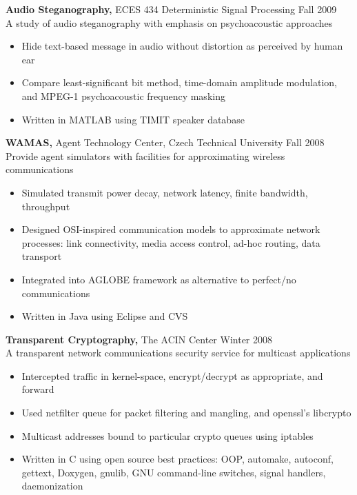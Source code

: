 \documentclass[margin]{res}
\begin{document}
\begin{resume}
\begin{telecom}
 {\bf Audio Steganography,} ECES 434 Deterministic Signal Processing \hfill Fall 2009 \\
A study of audio steganography with emphasis on psychoacoustic approaches
 \begin{itemize} \itemsep -2pt  %
 \item Hide text-based message in audio without distortion as perceived by human ear
 \item Compare least-significant bit method, time-domain amplitude modulation, and MPEG-1 psychoacoustic frequency masking 
 \item Written in MATLAB using TIMIT speaker database
 \end{itemize}
\end{telecom}

\begin{tech}
{\bf WAMAS,} Agent Technology Center, Czech Technical University \hfill Fall 2008 \\
Provide agent simulators with facilities for approximating wireless communications
\begin{itemize} \itemsep -2pt %
\item Simulated transmit power decay, network latency, finite bandwidth, throughput
\item Designed OSI-inspired communication models to approximate network processes: link connectivity, media access control, ad-hoc routing, data transport
\item Integrated into AGLOBE framework as alternative to perfect/no communications
\item Written in Java using Eclipse and CVS
\end{itemize}
\end{tech}

\begin{tech}
{\bf Transparent Cryptography,} The ACIN Center \hfill Winter 2008 \\
A transparent network communications security service for multicast applications
\begin{itemize} \itemsep -2pt %
\item Intercepted traffic in kernel-space, encrypt/decrypt as appropriate, and forward
\item Used netfilter queue for packet filtering and mangling, and openssl's libcrypto
\item Multicast addresses bound to particular crypto queues using iptables
\item Written in C using open source best practices: OOP, automake, autoconf, gettext, Doxygen, gnulib, GNU command-line switches, signal handlers, daemonization
\end{itemize}
\end{tech}


\end{resume}
\end{document}
